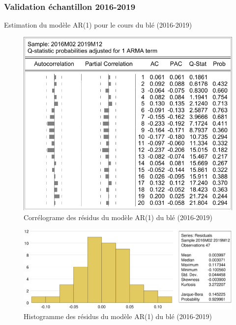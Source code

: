 \documentclass[12pt,a4paper]{article}
\begin{document}
\subsubsection{Validation échantillon 2016-2019}\label{appendix:valid19}
\begin{table}[H]
    \centering
    \caption{Estimation du modèle AR(1) pour le cours du blé (2016-2019)}
    \sffamily
    \resizebox{0.8\textwidth}{!}{}

\end{table}

\begin{figure}[H]
    \centering
    \includegraphics[]{annexe/4_3_1_modele_cor.pdf}
    \caption{Corrélograme des résidus du modèle AR(1) du blé (2016-2019)}
\end{figure}

\begin{figure}[H]
    \centering
    \includegraphics[width=\textwidth]{annexe/4_3_1_modele_hist.eps}
    \caption{Histogramme des résidus du modèle AR(1) du blé (2016-2019)}
\end{figure}
\end{document}
